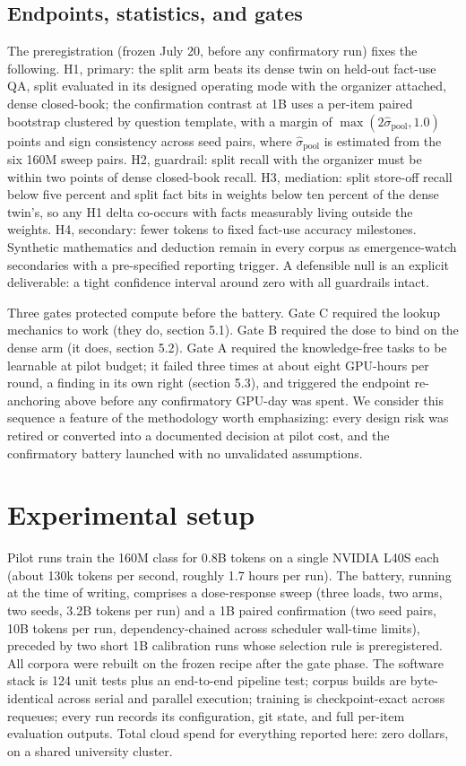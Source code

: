 \documentclass[11pt]{article}
\begin{document}
\subsection{Endpoints, statistics, and gates}

The preregistration (frozen July 20, before any confirmatory run) fixes
the following. H1, primary: the split arm beats its dense twin on held-out
fact-use QA, split evaluated in its designed operating mode with the
organizer attached, dense closed-book; the confirmation contrast at 1B
uses a per-item paired bootstrap clustered by question template, with a
margin of $\max(2\hat\sigma_{\text{pool}}, 1.0)$ points and sign
consistency across seed pairs, where $\hat\sigma_{\text{pool}}$ is
estimated from the six 160M sweep pairs. H2, guardrail: split recall with
the organizer must be within two points of dense closed-book recall. H3,
mediation: split store-off recall below five percent and split fact bits
in weights below ten percent of the dense twin's, so any H1 delta
co-occurs with facts measurably living outside the weights. H4,
secondary: fewer tokens to fixed fact-use accuracy milestones. Synthetic
mathematics and deduction remain in every corpus as emergence-watch
secondaries with a pre-specified reporting trigger. A defensible null is
an explicit deliverable: a tight confidence interval around zero with all
guardrails intact.

Three gates protected compute before the battery. Gate C required the
lookup mechanics to work (they do, section 5.1). Gate B required the dose
to bind on the dense arm (it does, section 5.2). Gate A required the
knowledge-free tasks to be learnable at pilot budget; it failed three
times at about eight GPU-hours per round, a finding in its own right
(section 5.3), and triggered the endpoint re-anchoring above before any
confirmatory GPU-day was spent. We consider this sequence a feature of
the methodology worth emphasizing: every design risk was retired or
converted into a documented decision at pilot cost, and the confirmatory
battery launched with no unvalidated assumptions.

\section{Experimental setup}

Pilot runs train the 160M class for 0.8B tokens on a single NVIDIA L40S
each (about 130k tokens per second, roughly 1.7 hours per run). The
battery, running at the time of writing, comprises a dose-response sweep
(three loads, two arms, two seeds, 3.2B tokens per run) and a 1B paired
confirmation (two seed pairs, 10B tokens per run, dependency-chained
across scheduler wall-time limits), preceded by two short 1B calibration
runs whose selection rule is preregistered. All corpora were rebuilt on
the frozen recipe after the gate phase. The software stack is 124 unit
tests plus an end-to-end pipeline test; corpus builds are byte-identical
across serial and parallel execution; training is checkpoint-exact across
requeues; every run records its configuration, git state, and full
per-item evaluation outputs. Total cloud spend for everything reported
here: zero dollars, on a shared university cluster.
\end{document}
